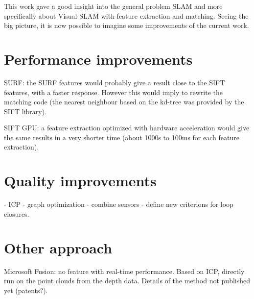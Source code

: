 \documentclass[a4paper,11pt]{kth-mag}
\begin{document}
This work gave a good insight into the general problem SLAM and more specifically about Visual SLAM with feature extraction and matching. Seeing the big picture, it is now possible to imagine some improvements of the current work.

\section{Performance improvements}

SURF: the SURF features would probably give a result close to the SIFT features, with a faster response. However this would imply to rewrite the matching code (the nearest neighbour based on the kd-tree was provided by the SIFT library).

SIFT GPU: a feature extraction optimized with hardware acceleration would give the same results in a very shorter time (about 1000s to 100ms for each feature extraction).

\section{Quality improvements}

- ICP
- graph optimization
- combine sensors
- define new criterions for loop closures.

\section{Other approach}

Microsoft Fusion: no feature with real-time performance. Based on ICP, directly run on the point clouds from the depth data. Details of the method not published yet (patents?).

  

\end{document}

